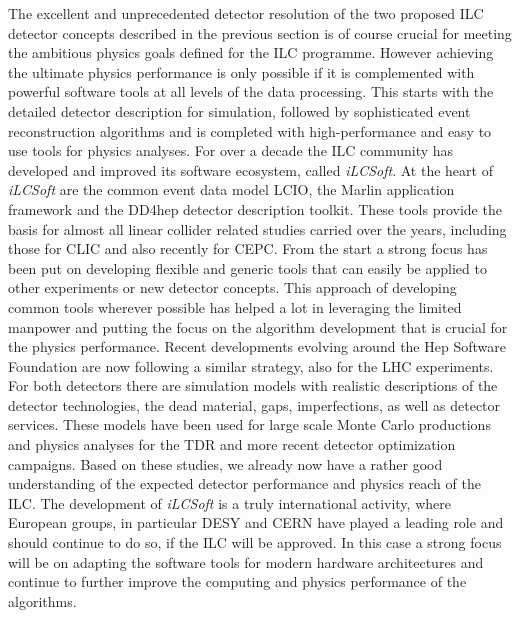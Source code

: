 \documentclass[%
 reprint,
 amsmath,amssymb,
 aps,
]{revtex4-1}
\begin{document}
The excellent and unprecedented detector resolution of the two proposed ILC detector concepts described
in the previous section is of course crucial for meeting the ambitious physics goals
defined for the ILC programme. However achieving the ultimate physics performance is only possible if it
is complemented with powerful software tools at all levels of the data processing. This starts with the
detailed detector description for simulation, followed by sophisticated event reconstruction algorithms
and is completed with high-performance and easy to use tools for physics analyses.
For over a decade the ILC community has developed and improved its software ecosystem, called \emph{iLCSoft}.
At the heart of \emph{iLCSoft} are the common event data model LCIO, the Marlin application framework and the
DD4hep detector description toolkit. These tools provide the basis for almost all linear collider related
studies carried over the years, including those for CLIC and also recently for CEPC.
From the start a strong focus has been put on developing flexible and generic tools that can easily be applied
to other experiments or new detector concepts. This approach of developing common tools wherever possible
has helped a lot in leveraging the limited manpower and putting the focus on the algorithm development that
is crucial for the physics performance. Recent developments evolving around the Hep Software Foundation are
now following a similar strategy, also for the LHC experiments.
For both detectors there are simulation models with realistic descriptions of the detector technologies,
the dead material, gaps, imperfections, as well as detector services. These models have been used for large
scale Monte Carlo productions and physics analyses for the TDR and more recent detector optimization
campaigns. Based on these studies, we already now have a rather good understanding of the expected
detector performance and physics reach of the ILC.
The development of \emph{iLCSoft} is a truly international activity, where European groups, in particular DESY and
CERN have played a leading role and should continue to do so, if the ILC will be approved. In this case
a strong focus will be on adapting the software tools for modern hardware architectures and continue to
further improve the computing and physics performance of the algorithms.
\end{document}
